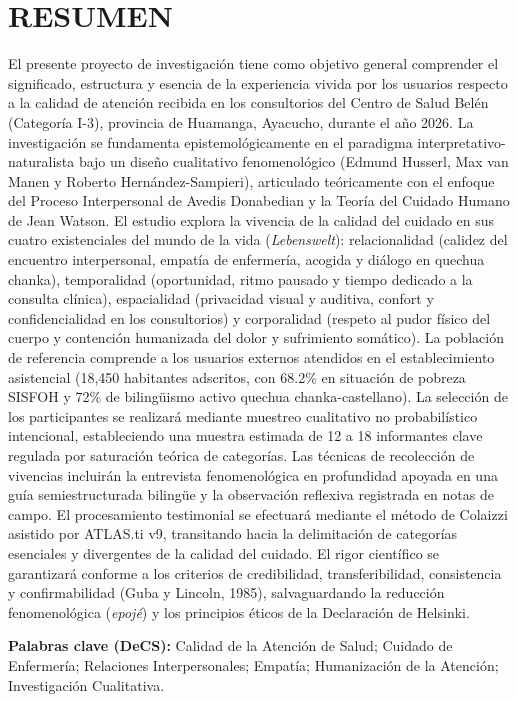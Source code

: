 \section*{RESUMEN}

\noindent El presente proyecto de investigación tiene como objetivo general comprender el significado, estructura y esencia de la experiencia vivida por los usuarios respecto a la calidad de atención recibida en los consultorios del Centro de Salud Belén (Categoría I-3), provincia de Huamanga, Ayacucho, durante el año 2026. La investigación se fundamenta epistemológicamente en el paradigma interpretativo-naturalista bajo un diseño cualitativo fenomenológico (Edmund Husserl, Max van Manen y Roberto Hernández-Sampieri), articulado teóricamente con el enfoque del Proceso Interpersonal de Avedis Donabedian y la Teoría del Cuidado Humano de Jean Watson. El estudio explora la vivencia de la calidad del cuidado en sus cuatro existenciales del mundo de la vida (\textit{Lebenswelt}): relacionalidad (calidez del encuentro interpersonal, empatía de enfermería, acogida y diálogo en quechua chanka), temporalidad (oportunidad, ritmo pausado y tiempo dedicado a la consulta clínica), espacialidad (privacidad visual y auditiva, confort y confidencialidad en los consultorios) y corporalidad (respeto al pudor físico del cuerpo y contención humanizada del dolor y sufrimiento somático). La población de referencia comprende a los usuarios externos atendidos en el establecimiento asistencial (18,450 habitantes adscritos, con 68.2\% en situación de pobreza SISFOH y 72\% de bilingüismo activo quechua chanka-castellano). La selección de los participantes se realizará mediante muestreo cualitativo no probabilístico intencional, estableciendo una muestra estimada de 12 a 18 informantes clave regulada por saturación teórica de categorías. Las técnicas de recolección de vivencias incluirán la entrevista fenomenológica en profundidad apoyada en una guía semiestructurada bilingüe y la observación reflexiva registrada en notas de campo. El procesamiento testimonial se efectuará mediante el método de Colaizzi asistido por ATLAS.ti v9, transitando hacia la delimitación de categorías esenciales y divergentes de la calidad del cuidado. El rigor científico se garantizará conforme a los criterios de credibilidad, transferibilidad, consistencia y confirmabilidad (Guba y Lincoln, 1985), salvaguardando la reducción fenomenológica (\textit{epojé}) y los principios éticos de la Declaración de Helsinki.

\vspace{0.8cm}
\noindent \textbf{Palabras clave (DeCS):} Calidad de la Atención de Salud; Cuidado de Enfermería; Relaciones Interpersonales; Empatía; Humanización de la Atención; Investigación Cualitativa.

\newpage
